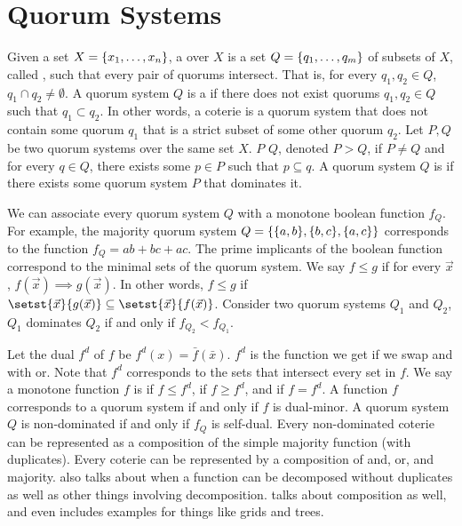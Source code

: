\section{Quorum Systems}
Given a set $X = \{x_1, \ldots, x_n\}$, a  over $X$ is
a set $Q = \{q_1, \ldots, q_m\}$ of subsets of $X$, called ,
such that every pair of quorums intersect. That is, for every $q_1, q_2 \in
Q$, $q_1 \cap q_2 \neq \emptyset$.
%
A quorum system $Q$ is a  if there does not exist quorums
$q_1, q_2 \in Q$ such that $q_1 \subset q_2$. In other words, a coterie is a
quorum system that does not contain some quorum $q_1$ that is a strict subset
of some other quorum $q_2$.
%
Let $P, Q$ be two quorum systems over the same set $X$. $P$ 
$Q$, denoted $P > Q$, if $P \neq Q$ and for every $q \in Q$, there exists some
$p \in P$ such that $p \subseteq q$. A quorum system $Q$ is 
if there exists some quorum system $P$ that dominates it.

We can associate every quorum system $Q$ with a monotone boolean function
$f_Q$. For example, the majority quorum system $Q = \{\{a, b\}, \{b,
c\}, \{a, c\}\}$ corresponds to the function $f_Q = ab + bc + ac$. The prime
implicants of the boolean function correspond to the minimal sets of the quorum
system. We say $f \leq g$ if for every $\vec{x}$, $f(\vec{x}) \implies
g(\vec{x})$. In other words, $f \leq g$ if $\setst{\vec{x}}{g(\vec{x})}
\subseteq \setst{\vec{x}}{f(\vec{x})}$. Consider two quorum systems $Q_1$ and
$Q_2$, $Q_1$ dominates $Q_2$ if and only if $f_{Q_2} < f_{Q_1}$.

\newcommand{\dual}[1]{#1^d}
Let the dual $\dual{f}$ of $f$ be $\dual{f}(x) = \bar{f}(\bar{x})$. $\dual{f}$
is the function we get if we swap and with or. Note that $\dual{f}$ corresponds
to the sets that intersect every set in $f$. We say a monotone function $f$
is  if $f \leq \dual{f}$,  if $f \geq
\dual{f}$, and  if $f = \dual{f}$. A function $f$
corresponds to a quorum system if and only if $f$ is dual-minor.  A quorum
system $Q$ is non-dominated if and only if $f_Q$ is self-dual. Every
non-dominated coterie can be represented as a composition of the simple
majority function (with duplicates). Every coterie can be represented by a
composition of and, or, and majority. \cite{ibaraki1993theory} also talks about
when a function can be decomposed without duplicates as well as other things
involving decomposition. \cite{neilsen1991general} talks about composition as
well, and even includes examples for things like grids and trees.

